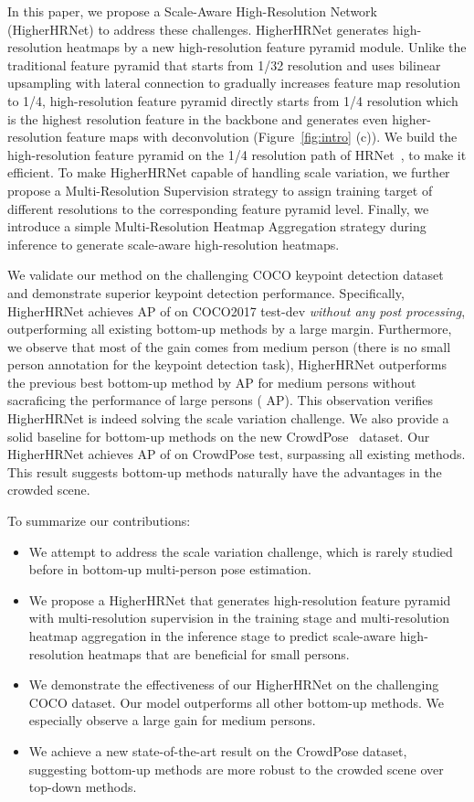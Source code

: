 \documentclass[10pt,twocolumn,letterpaper]{article}
\begin{document}
In this paper, we propose a Scale-Aware High-Resolution Network (HigherHRNet) to address these challenges. HigherHRNet generates high-resolution heatmaps by a new high-resolution feature pyramid module. Unlike the traditional feature pyramid that starts from 1/32 resolution and uses bilinear upsampling with lateral connection to gradually increases feature map resolution to 1/4, high-resolution feature pyramid directly starts from 1/4 resolution which is the highest resolution feature in the backbone and generates even higher-resolution feature maps with deconvolution (Figure~\ref{fig:intro} (c)). We build the high-resolution feature pyramid on the 1/4 resolution path of HRNet~\cite{sun2019deep,WangSCJDZLMTWLX19}, to make it efficient. To make HigherHRNet capable of handling scale variation, we further propose a Multi-Resolution Supervision strategy to assign training target of different resolutions to the corresponding feature pyramid level. Finally, we introduce a simple Multi-Resolution Heatmap Aggregation strategy
during inference to generate scale-aware high-resolution heatmaps.

We validate our method on the challenging COCO keypoint detection dataset \cite{lin2014microsoft} and demonstrate superior keypoint detection performance. Specifically, HigherHRNet achieves AP of  on COCO2017 test-dev \emph{without any post processing}, outperforming all existing bottom-up methods by a large margin. Furthermore, we observe that most of the gain comes from medium person (there is no small person annotation for the keypoint detection task), HigherHRNet outperforms the previous best bottom-up method by  AP for medium persons without sacraficing the performance of large persons ( AP). This observation verifies HigherHRNet is indeed solving the scale variation challenge. We also provide a solid baseline for bottom-up methods on the new CrowdPose~\cite{li2019crowdpose} dataset. Our HigherHRNet achieves AP of  on CrowdPose test, surpassing all existing methods. This result suggests bottom-up methods naturally have the advantages in the crowded scene.

To summarize our contributions:
\begin{itemize}
\setlength\itemsep{0em}
\item
We attempt to address the scale variation challenge,
which is rarely studied before in bottom-up multi-person pose estimation.
\item
We propose a HigherHRNet that generates high-resolution feature pyramid with multi-resolution supervision in the training stage and multi-resolution heatmap aggregation in the inference stage to predict scale-aware high-resolution heatmaps that are beneficial for small persons.
\item
We demonstrate the effectiveness of our HigherHRNet on the challenging COCO dataset. Our model outperforms all other bottom-up methods. We especially observe a large gain for medium persons.
\item
We achieve a new state-of-the-art result on the CrowdPose dataset, suggesting bottom-up methods are more robust to the crowded scene over top-down methods.
\end{itemize}
\end{document}
